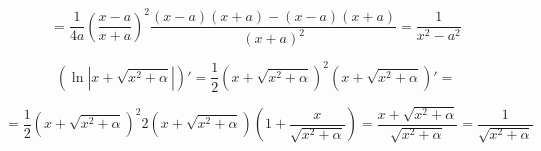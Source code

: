 {\begin{equation}
= \frac{1}{4a} \left( \frac{x - a}{x + a} \right)^2 \frac{(x - a)(x + a) - (x - a)(x + a)}{(x + a)^2} = \frac{1}{x^2 - a^2}
\end{equation}


\begin{equation}
\left( \ln \left| x + \sqrt{x^2 + \alpha} \right| \right)'  = \frac{1}{2} \left( x + \sqrt{x^2 + \alpha} \right)^2 \left( x + \sqrt{x^2 + \alpha} \right)' = 
\end{equation}

\begin{equation}
= \frac{1}{2} \left( x + \sqrt{x^2 + \alpha} \right)^2 2 \left( x + \sqrt{x^2 + \alpha} \right) \left( 1 + \frac{x}{\sqrt{x^2 + \alpha}} \right) = \frac{x + \sqrt{x^2 + \alpha}}{\sqrt{x^2 + \alpha}} = \frac{1}{\sqrt{x^2 + \alpha}}
\end{equation} 


}